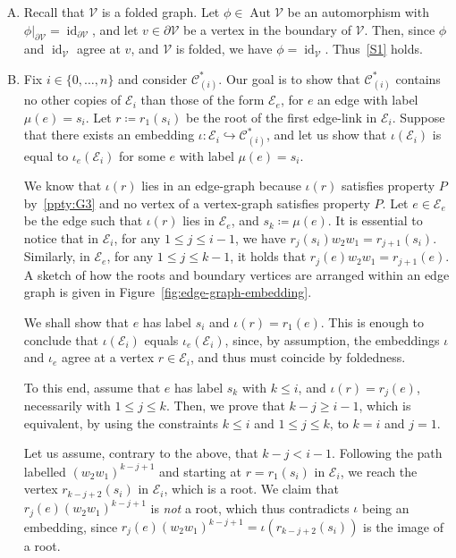 \documentclass[ALCO,ThmDefs,Unicode,epreuves]{cedram}
\newcommand{\cC}{\mathcal{C}}
\newcommand{\cV}{\mathcal{V}}
\newcommand{\cE}{\mathcal{E}}
\DeclareMathOperator{\aut}{Aut}
\DeclareMathOperator{\id}{id}
\begin{document}
\begin{enumerate}[S.\arabic*]
\item %
Recall that $\cV$ is a folded graph. Let ${\phi} \in \aut \cV$ be an automorphism with ${\phi}|_{{\partial}\cV} = \id _{{\partial}\cV}$, and let $v\in{\partial}\cV$ be a vertex in the boundary of $\cV$. Then, since ${\phi}$ and $\id _{\cV}$ agree at $v$, and $\cV$ is folded, we have ${\phi}= \id _{\cV}$. Thus~\ref{S1} holds.
\item %
Fix $i \in \{ 0, \dots, n\}$ and consider $\cC^*_{(i)}$. Our goal is to show that $\cC^*_{(i)}$ contains no other copies of $\cE_i$ than those of the form $\cE_e$, for $e$ an edge with label $\mu(e) = s_i$. Let $r\coloneqq r_1(s_i)$ be the root of the first edge-link in $\cE_i$. Suppose that there exists an embedding $\iota : \cE_i \hookrightarrow \cC^{*}_{(i)}$, and let us show that $\iota(\cE_i)$ is equal to ${\iota}_e(\cE_i)$ for some $e$ with label $\mu(e) = s_i$.

We know that $\iota(r)$ lies in an edge-graph because $\iota(r)$ satisfies property $P$ by~\ref{ppty:G3} and no vertex of a vertex-graph satisfies property $P$. Let $e\in \cE_e$ be the edge such that $\iota(r)$ lies in $\cE_{e}$, and $s_k \coloneqq {\mu}(e)$. It is essential to notice that in $\cE_i$, for any $1\leq j\leq i-1$, we have $r_j(s_i)w_{2}w_{1} = r_{j+1}(s_i)$. Similarly, in $\cE_e$, for any $1\leq j\leq k-1$, it holds that $r_j(e)w_{2}w_{1} = r_{j+1}(e)$. A sketch of how the roots and boundary vertices are arranged within an edge graph is given in Figure~\ref{fig:edge-graph-embedding}. 

We shall show that $e$ has label $s_i$ and ${\iota}(r) = r_1(e)$. This is enough to conclude that ${\iota}(\cE_i)$ equals ${\iota}_e(\cE_i)$, since, by assumption, the embeddings ${\iota}$ and ${\iota}_{e}$ agree at a vertex $r \in \cE_i$, and thus must coincide by foldedness.

To this end, assume that $e$ has label $s_k$ with $k\leq i$, and ${\iota}(r) = r_j(e)$, necessarily with $1\leq j\leq k$. Then, we prove that $k-j \geq i-1$, which is equivalent, by using the constraints $k\leq i$ and $1\leq j\leq k$, to $k=i$ and $j=1$. 

Let us assume, contrary to the above, that $k-j<i-1$. Following the path labelled $(w_{2}w_{1})^{k-j+1}$ and starting at $r = r_{1}(s_i)$ in $\cE_i$, we reach the vertex $r_{k-j+2}(s_i)$ in $\cE_i$, which is a root. We claim that $r_j(e)(w_{2}w_{1})^{k-j+1}$ is \emph{not} a root, which thus contradicts ${\iota}$ being an embedding, since $r_j(e)(w_{2}w_{1})^{k-j+1} = {\iota}(r_{k-j+2}(s_i))$ is the image of a root.
 

\end{enumerate}
\end{document}
